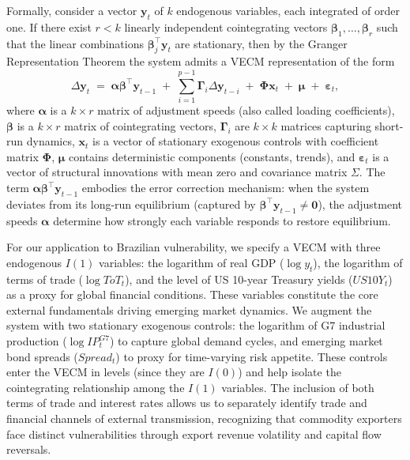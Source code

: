 \documentclass[12pt,a4paper]{article}
\numberwithin{equation}{section}
\theoremstyle{definition}
\theoremstyle{remark}
\newcommand{\vect}[1]{\boldsymbol{#1}}
\begin{document}
Formally, consider a vector $\vect{y}_t$ of $k$ endogenous variables, each integrated of order one. If there exist $r < k$ linearly independent cointegrating vectors $\vect{\beta}_1, \ldots, \vect{\beta}_r$ such that the linear combinations $\vect{\beta}_j^\top \vect{y}_t$ are stationary, then by the Granger Representation Theorem the system admits a VECM representation of the form
\begin{equation}
\label{eq:vecm_general}
\Delta \vect{y}_t \;=\; \vect{\alpha} \vect{\beta}^\top \vect{y}_{t-1} \;+\; \sum_{i=1}^{p-1} \vect{\Gamma}_i \Delta \vect{y}_{t-i} \;+\; \vect{\Phi} \vect{x}_t \;+\; \vect{\mu} \;+\; \vect{\varepsilon}_t,
\end{equation}
where $\vect{\alpha}$ is a $k \times r$ matrix of adjustment speeds (also called loading coefficients), $\vect{\beta}$ is a $k \times r$ matrix of cointegrating vectors, $\vect{\Gamma}_i$ are $k \times k$ matrices capturing short-run dynamics, $\vect{x}_t$ is a vector of stationary exogenous controls with coefficient matrix $\vect{\Phi}$, $\vect{\mu}$ contains deterministic components (constants, trends), and $\vect{\varepsilon}_t$ is a vector of structural innovations with mean zero and covariance matrix $\Sigma$. The term $\vect{\alpha} \vect{\beta}^\top \vect{y}_{t-1}$ embodies the error correction mechanism: when the system deviates from its long-run equilibrium (captured by $\vect{\beta}^\top \vect{y}_{t-1} \neq \vect{0}$), the adjustment speeds $\vect{\alpha}$ determine how strongly each variable responds to restore equilibrium.

For our application to Brazilian vulnerability, we specify a VECM with three endogenous $I(1)$ variables: the logarithm of real GDP ($\log y_t$), the logarithm of terms of trade ($\log ToT_t$), and the level of US 10-year Treasury yields ($US10Y_t$) as a proxy for global financial conditions. These variables constitute the core external fundamentals driving emerging market dynamics. We augment the system with two stationary exogenous controls: the logarithm of G7 industrial production ($\log IP^{G7}_t$) to capture global demand cycles, and emerging market bond spreads ($Spread_t$) to proxy for time-varying risk appetite. These controls enter the VECM in levels (since they are $I(0)$) and help isolate the cointegrating relationship among the $I(1)$ variables. The inclusion of both terms of trade and interest rates allows us to separately identify trade and financial channels of external transmission, recognizing that commodity exporters face distinct vulnerabilities through export revenue volatility and capital flow reversals.
\end{document}

